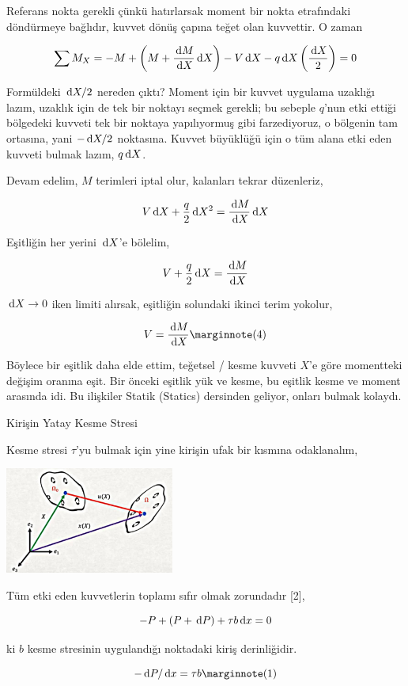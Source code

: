 \documentclass[12pt,fleqn]{article}\usepackage{../../common}
\begin{document}
Referans nokta gerekli çünkü hatırlarsak moment bir nokta etrafındaki
döndürmeye bağlıdır, kuvvet dönüş çapına teğet olan kuvvettir. O zaman 

$$
\sum M_{X} = -M + \left( M + \frac{\,\mathrm{d} M}{\,\mathrm{d} X} \,\mathrm{d} X \right) -
V \,\mathrm{d} X - q \,\mathrm{d} X \left( \frac{\,\mathrm{d} X}{2}  \right) = 0
$$

Formüldeki $\,\mathrm{d} X / 2$ nereden çıktı? Moment için bir kuvvet uygulama uzaklığı
lazım, uzaklık için de tek bir noktayı seçmek gerekli; bu sebeple $q$'nun etki
ettiği bölgedeki kuvveti tek bir noktaya yapılıyormuş gibi farzediyoruz, o
bölgenin tam ortasına, yani $- \,\mathrm{d} X / 2$ noktasına.  Kuvvet büyüklüğü için o
tüm alana etki eden kuvveti bulmak lazım, $q \,\mathrm{d} X$.

Devam edelim, $M$ terimleri iptal olur, kalanları tekrar düzenleriz,

$$
V \,\mathrm{d} X + \frac{q}{2} \,\mathrm{d} X^2 = \frac{\,\mathrm{d} M}{\,\mathrm{d} X} \,\mathrm{d} X
$$

Eşitliğin her yerini $\,\mathrm{d} X$'e bölelim,

$$
V + \frac{q}{2} \,\mathrm{d} X = \frac{\,\mathrm{d} M}{\,\mathrm{d} X} 
$$

$\,\mathrm{d} X \to 0$ iken limiti alırsak, eşitliğin solundaki ikinci terim yokolur,

$$
V = \frac{\ud M}{\ud X}
\mlabel{4}
$$

Böylece bir eşitlik daha elde ettim, teğetsel / kesme kuvveti $X$'e göre
momentteki değişim oranına eşit. Bir önceki eşitlik yük ve kesme, bu eşitlik
kesme ve moment arasında idi. Bu ilişkiler Statik (Statics) dersinden
geliyor, onları bulmak kolaydı.

Kirişin Yatay Kesme Stresi

Kesme stresi $\tau$'yu bulmak için yine kirişin ufak bir kısmına odaklanalım,

\includegraphics[width=15em]{phy_020_strs_01_05.jpg}

Tüm etki eden kuvvetlerin toplamı sıfır olmak zorundadır [2],

$$
-P + (P + \,\mathrm{d} P) + \tau b \,\mathrm{d} x = 0
$$

ki $b$ kesme stresinin uygulandığı noktadaki kiriş derinliğidir. 

$$
-\ud P/\ud x = \tau b
\mlabel{1}
$$
\end{document}
